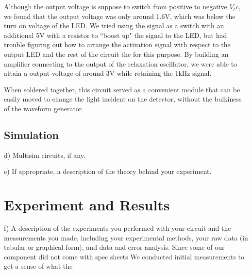 \documentclass[twocolumn]{article}
\begin{document}
\par Although the output voltage is suppose to switch from positive to negative $V_cc$, we found that the output voltage was only around 1.6V, which was below the turn on voltage of the LED. We tried using the signal as a switch with an additional 5V with a resistor to ``boost up" the signal to the LED, but had trouble figuring out how to arrange the activation signal with respect to the output LED and the rest of the circuit the for this purpose. By building an amplifier connecting to the output of the relaxation oscillator, we were able to attain a output voltage of around 3V while retaining the 1kHz signal.
\par When soldered together, this circuit served as a convenient module that can be easily moved to change the light incident on the detector, without the bulkiness of the waveform generator.
\subsection{Simulation}
d)              Multisim circuits, if any.

e)               If appropriate, a description of the theory behind your experiment.
\section{Experiment and Results}
f)                A description of the experiments you performed with your circuit and the measurements you made, including your experimental methods, your raw data (in tabular or graphical form), and data and error analysis.
Since some of our component did not come with spec sheets We conducted initial measurements to get a sense of what the 
\end{document}
